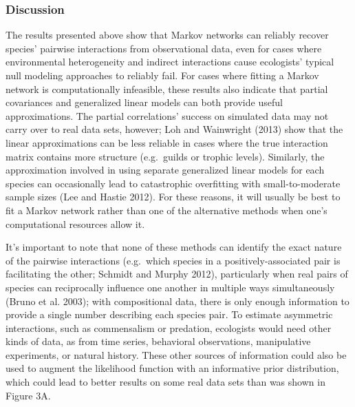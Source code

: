 \documentclass[12pt,]{article}
\begin{document}
\begin{spacing}{1.9}
\begin{flushleft}
\subsubsection{Discussion}\label{discussion}

The results presented above show that Markov networks can reliably
recover species' pairwise interactions from observational data, even for
cases where environmental heterogeneity and indirect interactions cause
ecologists' typical null modeling approaches to reliably fail. For cases
where fitting a Markov network is computationally infeasible, these
results also indicate that partial covariances and generalized linear
models can both provide useful approximations. The partial correlations'
success on simulated data may not carry over to real data sets, however;
Loh and Wainwright (2013) show that the linear approximations can be
less reliable in cases where the true interaction matrix contains more
structure (e.g.~guilds or trophic levels). Similarly, the approximation
involved in using separate generalized linear models for each species
can occasionally lead to catastrophic overfitting with small-to-moderate
sample sizes (Lee and Hastie 2012). For these reasons, it will usually
be best to fit a Markov network rather than one of the alternative
methods when one's computational resources allow it.

It's important to note that none of these methods can identify the exact
nature of the pairwise interactions (e.g.~which species in a
positively-associated pair is facilitating the other; Schmidt and Murphy
2012), particularly when real pairs of species can reciprocally
influence one another in multiple ways simultaneously (Bruno et al.
2003); with compositional data, there is only enough information to
provide a single number describing each species pair. To estimate
asymmetric interactions, such as commensalism or predation, ecologists
would need other kinds of data, as from time series, behavioral
observations, manipulative experiments, or natural history. These other
sources of information could also be used to augment the likelihood
function with an informative prior distribution, which could lead to
better results on some real data sets than was shown in Figure 3A.


\end{flushleft}
\end{spacing}
\end{document}

